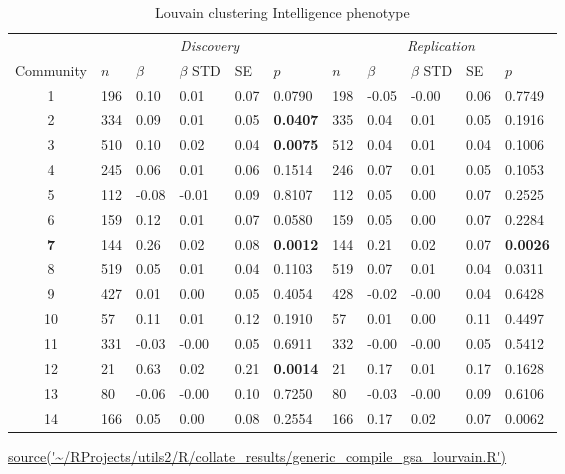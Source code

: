 \begin{table}[ht]
\centering
\setlength{\extrarowheight}{2pt}
\begin{tabular}{cllllllllll}
  \toprule
   &  \multicolumn{5}{c}{\textit{Discovery}} & \multicolumn{5}{c}{\textit{Replication}} \\
    \cmidrule{2-11}
Community & $n$ & $\beta$ & $\beta$ STD & SE & $p$ & $n$ & $\beta$ & $\beta$ STD & SE & $p$\\ 
  \midrule
1 & 196 & 0.10 & 0.01 & 0.07 & 0.0790 & 198 & -0.05 & -0.00 & 0.06 & 0.7749 \\ 
  2 & 334 & 0.09 & 0.01 & 0.05 & \textbf{0.0407} & 335 & 0.04 & 0.01 & 0.05 & 0.1916 \\ 
  3 & 510 & 0.10 & 0.02 & 0.04 & \textbf{0.0075} & 512 & 0.04 & 0.01 & 0.04 & 0.1006 \\ 
  4 & 245 & 0.06 & 0.01 & 0.06 & 0.1514 & 246 & 0.07 & 0.01 & 0.05 & 0.1053 \\ 
  5 & 112 & -0.08 & -0.01 & 0.09 & 0.8107 & 112 & 0.05 & 0.00 & 0.07 & 0.2525 \\ 
  6 & 159 & 0.12 & 0.01 & 0.07 & 0.0580 & 159 & 0.05 & 0.00 & 0.07 & 0.2284 \\ 
  \textbf{7} & 144 & 0.26 & 0.02 & 0.08 & \textbf{0.0012} & 144 & 0.21 & 0.02 & 0.07 & \textbf{0.0026} \\ 
  8 & 519 & 0.05 & 0.01 & 0.04 & 0.1103 & 519 & 0.07 & 0.01 & 0.04 & 0.0311 \\ 
  9 & 427 & 0.01 & 0.00 & 0.05 & 0.4054 & 428 & -0.02 & -0.00 & 0.04 & 0.6428 \\ 
  10 & 57 & 0.11 & 0.01 & 0.12 & 0.1910 & 57 & 0.01 & 0.00 & 0.11 & 0.4497 \\ 
  11 & 331 & -0.03 & -0.00 & 0.05 & 0.6911 & 332 & -0.00 & -0.00 & 0.05 & 0.5412 \\ 
  12 & 21 & 0.63 & 0.02 & 0.21 & \textbf{0.0014} & 21 & 0.17 & 0.01 & 0.17 & 0.1628 \\ 
  13 & 80 & -0.06 & -0.00 & 0.10 & 0.7250 & 80 & -0.03 & -0.00 & 0.09 & 0.6106 \\ 
  14 & 166 & 0.05 & 0.00 & 0.08 & 0.2554 & 166 & 0.17 & 0.02 & 0.07 & 0.0062 \\ 
   \bottomrule
\end{tabular}
\caption{Louvain clustering Intelligence phenotype} 
\label{tab:louvain clustering intelligence}
\tiny\url{source('~/RProjects/utils2/R/collate_results/generic_compile_gsa_lourvain.R')}
\end{table}


